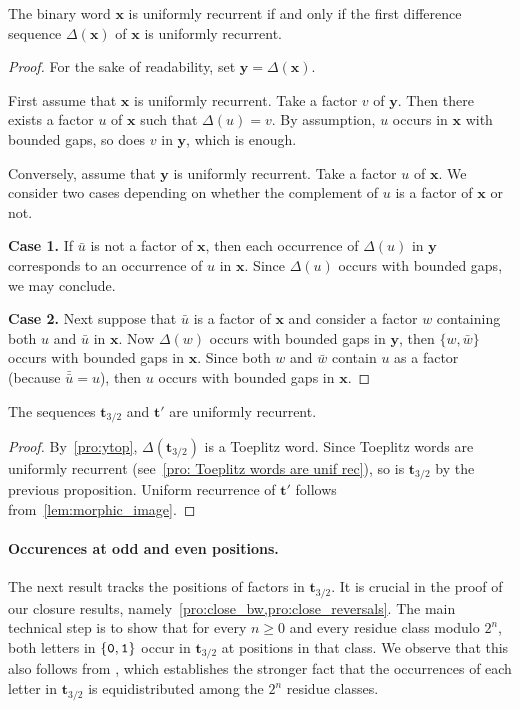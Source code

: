 \documentclass[12pt,reqno]{article}
\begin{document}
\begin{proposition}\label{pro:fdifur}
The binary word $\mathbf{x}$ is uniformly recurrent if and only if the first difference sequence $\Delta(\mathbf{x})$ of $\mathbf{x}$ is uniformly recurrent.
\end{proposition}
\begin{proof}
For the sake of readability,  set $\mathbf{y}=\Delta(\mathbf{x})$.

First assume that $\mathbf{x}$ is uniformly recurrent.
Take a factor $v$ of $\mathbf{y}$.
Then there exists a factor $u$ of $\mathbf{x}$ such that $\Delta(u)=v$.
By assumption,  $u$ occurs in $\mathbf{x}$ with bounded gaps,  so does $v$ in $\mathbf{y}$,  which is enough.

Conversely, assume that $\mathbf{y}$ is uniformly recurrent.
Take a factor $u$ of $\mathbf{x}$.
We consider two cases depending on whether the complement of $u$ is a factor of $\mathbf{x}$ or not.

\textbf{Case 1.} If $\bar{u}$ is not a factor of $\mathbf{x}$,  then each occurrence of $\Delta(u)$ in $\mathbf{y}$ corresponds to an occurrence of $u$ in $\mathbf{x}$. 
Since $\Delta(u)$ occurs with bounded gaps,  we may conclude.

\textbf{Case 2.} Next suppose that $\bar{u}$ is a factor of $\mathbf{x}$ and consider a factor $w$ containing both $u$ and $\bar{u}$ in $\mathbf{x}$.
Now $\Delta(w)$ occurs with bounded gaps in $\mathbf{y}$,  then $\{w,\bar{w}\}$ occurs with bounded gaps in $\mathbf{x}$.
Since both $w$ and $\bar{w}$ contain $u$ as a factor (because $\bar{\bar{u}}=u$),  then $u$ occurs with bounded gaps in $\mathbf{x}$.
\end{proof}

\begin{corollary}\label{cor:unif_rec}
  The sequences $\mathbf{t}_{3/2}$ and $\mathbf{t}'$ are uniformly recurrent. 
\end{corollary}


\begin{proof}
  By~\cref{pro:ytop}, $\Delta(\mathbf{t}_{3/2})$ is a Toeplitz word. 
Since Toeplitz words are uniformly recurrent (see~\cref{pro: Toeplitz words are unif rec}),  so is $\mathbf{t}_{3/2}$ by the previous proposition.
Uniform recurrence of $\mathbf{t}'$ follows from~\cref{lem:morphic_image}.
\end{proof}


\paragraph{Occurences at odd and even positions.} 
The next result tracks the positions of factors in $\mathbf{t}_{3/2}$.
It is crucial in the proof of our closure results,  namely~\cref{pro:close_bw,pro:close_reversals}.
The main technical step is to show that for every $n \ge 0$ and every residue class modulo $2^n$, 
both letters in $\{{\tt 0}, {\tt 1}\}$ occur in $\mathbf{t}_{3/2}$ at positions in that class.
We observe that this also follows from , which establishes the stronger fact 
that the occurrences of each letter in $\mathbf{t}_{3/2}$ is equidistributed among the $2^n$ residue classes.
\end{document}
